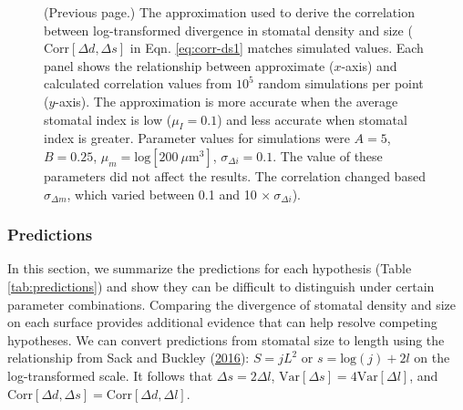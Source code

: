 \documentclass[
  12pt,
]{article}
\begin{document}
\begin{figure} [t!]
\caption{(Previous page.) The approximation used to derive the correlation between log-transformed divergence in stomatal density and size ($\textrm{Corr}[\Delta d, \Delta s]$ in Eqn. \ref{eq:corr-ds1} matches simulated values. Each panel shows the relationship between approximate ($x$-axis) and calculated correlation values from $10^5$ random simulations per point ($y$-axis). The approximation is more accurate when the average stomatal index is low ($\mu_I = 0.1$) and less accurate when stomatal index is greater. Parameter values for simulations were $A = 5$, $B = 0.25$, $\mu_m = \textrm{log}[200~\mu\textrm{m}^3]$, $\sigma_{\Delta i} = 0.1$. The value of these parameters did not affect the results. The correlation changed based $\sigma_{\Delta m}$, which varied between 0.1 and 10 $\times~\sigma_{\Delta i}$).}
\end{figure}

\hypertarget{predictions}{%
\subsubsection{Predictions}\label{predictions}}

In this section, we summarize the predictions for each hypothesis (Table \ref{tab:predictions}) and show they can be difficult to distinguish under certain parameter combinations. Comparing the divergence of stomatal density and size on each surface provides additional evidence that can help resolve competing hypotheses. We can convert predictions from stomatal size to length using the relationship from Sack and Buckley (\protect\hyperlink{ref-sack_developmental_2016}{2016}): \(S = jL^2\) or \(s = \textrm{log}(j) + 2 l\) on the log-transformed scale. It follows that \(\Delta s = 2 \Delta l\), \(\textrm{Var}[\Delta s] = 4 \textrm{Var}[\Delta l]\), and \(\textrm{Corr}[\Delta d, \Delta s] = \textrm{Corr}[\Delta d, \Delta l]\).
\end{document}
